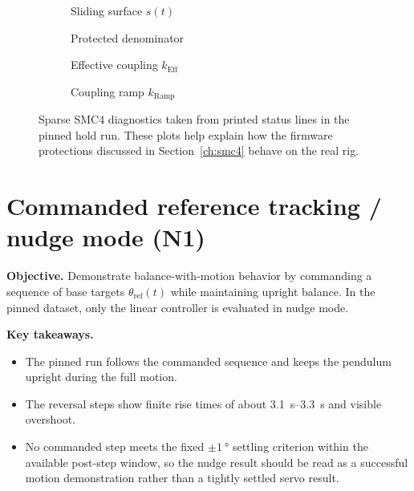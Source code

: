 \begin{figure}[htbp]
  \centering
  \begin{subfigure}[t]{0.48\linewidth}
    \centering
    \caption{Sliding surface $s(t)$}
  \end{subfigure}\hfill
  \begin{subfigure}[t]{0.48\linewidth}
    \centering
    \caption{Protected denominator}
  \end{subfigure}

  \medskip

  \begin{subfigure}[t]{0.48\linewidth}
    \centering
    \caption{Effective coupling $k_{\mathrm{Eff}}$}
  \end{subfigure}\hfill
  \begin{subfigure}[t]{0.48\linewidth}
    \centering
    \caption{Coupling ramp $k_{\mathrm{Ramp}}$}
  \end{subfigure}
  \caption{Sparse SMC4 diagnostics taken from printed status lines in the pinned hold run. These plots help explain how the firmware protections discussed in Section~\ref{ch:smc4} behave on the real rig.}
  \label{fig:hold_smc4_support}
\end{figure}
\clearpage

\section{Commanded reference tracking / nudge mode (N1)}
\noindent\textbf{Objective.} Demonstrate balance-with-motion behavior by commanding a sequence of base targets $\theta_{\mathrm{ref}}(t)$ while maintaining upright balance. In the pinned dataset, only the linear controller is evaluated in nudge mode.

\noindent\textbf{Key takeaways.}
\begin{itemize}
  \item The pinned run follows the commanded sequence and keeps the pendulum upright during the full motion.
  \item The reversal steps show finite rise times of about \SIrange{3.1}{3.3}{s} and visible overshoot.
  \item No commanded step meets the fixed $\pm\SI{1}{\degree}$ settling criterion within the available post-step window, so the nudge result should be read as a successful motion demonstration rather than a tightly settled servo result.
\end{itemize}

